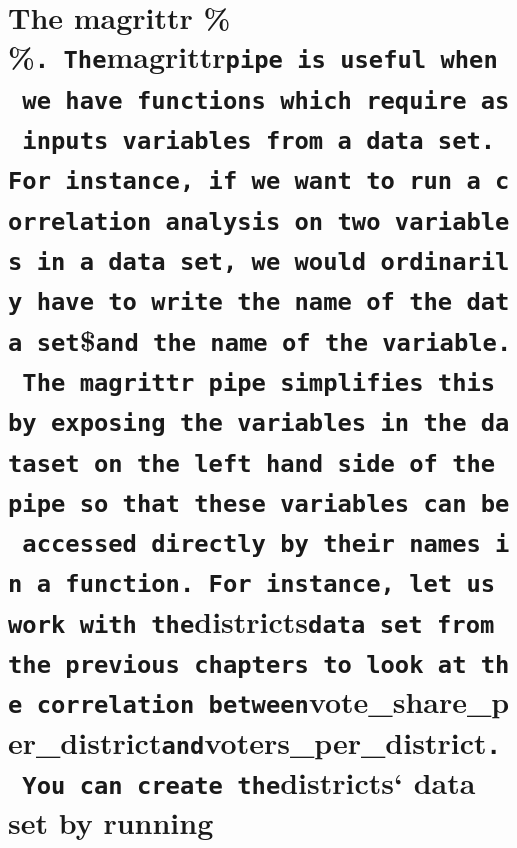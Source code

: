 \documentclass[
]{book}
\begin{document}
{\section{\texorpdfstring{The magrittr \%\(%
\)\%\texttt{.\ The}magrittr\texttt{pipe\ is\ useful\ when\ we\ have\ functions\ which\ require\ as\ inputs\ variables\ from\ a\ data\ set.\ For\ instance,\ if\ we\ want\ to\ run\ a\ correlation\ analysis\ on\ two\ variables\ in\ a\ data\ set,\ we\ would\ ordinarily\ have\ to\ write\ the\ name\ of\ the\ data\ set}\$\texttt{and\ the\ name\ of\ the\ variable.\ The\ magrittr\ pipe\ simplifies\ this\ by\ exposing\ the\ variables\ in\ the\ dataset\ on\ the\ left\ hand\ side\ of\ the\ pipe\ so\ that\ these\ variables\ can\ be\ accessed\ directly\ by\ their\ names\ in\ a\ function.\ For\ instance,\ let\ us\ work\ with\ the}districts\texttt{data\ set\ from\ the\ previous\ chapters\ to\ look\ at\ the\ correlation\ between}vote\_share\_per\_district\texttt{and}voters\_per\_district\texttt{.\ You\ can\ create\ the}districts` data set by running}{The magrittr \%\% exposition pipe The most commonly used pipe in tidyverse is the `dplyr` pipe, i.e. `\%\textgreater\%`. There is, however, another useful pipe which deserves a mention, it is the `magrittr` pipe, `\%\%. Themagrittrpipe is useful when we have functions which require as inputs variables from a data set. For instance, if we want to run a correlation analysis on two variables in a data set, we would ordinarily have to write the name of the data set\$and the name of the variable. The magrittr pipe simplifies this by exposing the variables in the dataset on the left hand side of the pipe so that these variables can be accessed directly by their names in a function. For instance, let us work with thedistrictsdata set from the previous chapters to look at the correlation betweenvote\_share\_per\_districtandvoters\_per\_district. You can create thedistricts` data set by running}}\label{the-magrittr-exposition-pipe-the-most-commonly-used-pipe-in-tidyverse-is-the-dplyr-pipe-i.e.-.-there-is-however-another-useful-pipe-which-deserves-a-mention-it-is-the-magrittr-pipe-.-themagrittrpipe-is-useful-when-we-have-functions-which-require-as-inputs-variables-from-a-data-set.-for-instance-if-we-want-to-run-a-correlation-analysis-on-two-variables-in-a-data-set-we-would-ordinarily-have-to-write-the-name-of-the-data-setand-the-name-of-the-variable.-the-magrittr-pipe-simplifies-this-by-exposing-the-variables-in-the-dataset-on-the-left-hand-side-of-the-pipe-so-that-these-variables-can-be-accessed-directly-by-their-names-in-a-function.-for-instance-let-us-work-with-thedistrictsdata-set-from-the-previous-chapters-to-look-at-the-correlation-betweenvote_share_per_districtandvoters_per_district.-you-can-create-thedistricts-data-set-by-running}}
\end{document}
